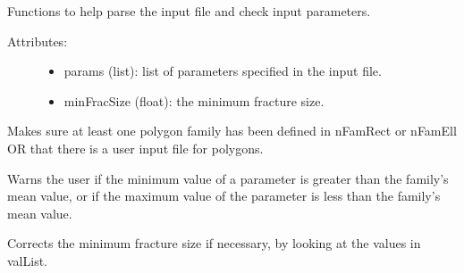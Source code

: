 \documentclass[letterpaper,10pt,english]{sphinxmanual}
\begin{document}

\begin{fulllineitems}
\label{pydfnworks:pydfnworks.helper.input_helper}
Functions to help parse the input file and check input parameters.
\begin{description}
\item[{Attributes:}] \leavevmode\begin{itemize}
\item {} 
params (list): list of parameters specified in the input file.

\item {} 
minFracSize (float): the minimum fracture size.

\end{itemize}

\end{description}

\begin{fulllineitems}
\label{pydfnworks:pydfnworks.helper.input_helper.check_fam_count}
Makes sure at least one polygon family has been defined in nFamRect or nFamEll
OR that there is a user input file for polygons.

\end{fulllineitems}


\begin{fulllineitems}
\label{pydfnworks:pydfnworks.helper.input_helper.check_mean}
Warns the user if the minimum value of a parameter is greater than the family's mean value, or if the
maximum value of the parameter is less than the family's mean value.

\end{fulllineitems}


\begin{fulllineitems}
\label{pydfnworks:pydfnworks.helper.input_helper.check_min_frac_size}
Corrects the minimum fracture size if necessary, by looking at the values in valList.


\end{fulllineitems}
\end{fulllineitems}
\end{document}
